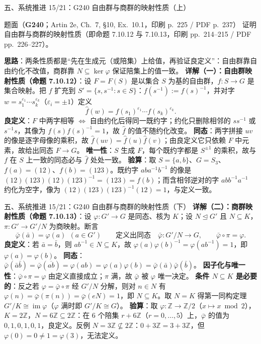 \documentclass[aspectratio=169,10pt,fontset=none]{ctexbeamer}
\newcommand{\ex}[1]{\textcolor{accent}{\footnotesize\bfseries #1}}
\newcommand{\key}[1]{\textcolor{ink}{\bfseries #1}}
\begin{document}
\begin{frame}[t]{五、系统推进 15/21：G240 自由群与商群的映射性质（上）}
\label{ex:G240}
\scriptsize
\begin{block}{\footnotesize 题面（\ex{G240}；Artin 2e, Ch.~7, \S10, Ex.~10.1，印刷 p.~225 / PDF p.~237）}
证明自由群与商群的映射性质（即命题 7.10.12 与 7.10.13，印刷 pp.~214--215 / PDF pp.~226--227）。
\end{block}
\key{思路}：两条性质都是“先在生成元（或陪集）上给值，再验证良定义”：自由群靠自由约化不改值，商群靠 $N\subseteq\ker\varphi$ 保证陪集上的值一致。
\key{详解（一）：自由群映射性质（命题 7.10.12）}：设 $F=F(S)$ 是以集合 $S$ 为基的自由群，$f:S\to G$ 是集合映射。把 $f$ 扩充到 $S'=\{s,s^{-1}:s\in S\}$：$f(s^{-1}):=f(s)^{-1}$，并对字 $w=s_1^{\varepsilon_1}\cdots s_k^{\varepsilon_k}$（$\varepsilon_i=\pm1$）定义
\[ \widehat f(w)=f(s_1)^{\varepsilon_1}\cdots f(s_k)^{\varepsilon_k}. \]
\textbf{良定义}：$F$ 中两字相等 $\iff$ 自由约化后得同一既约字；约化只删除相邻的 $ss^{-1}$ 或 $s^{-1}s$，其像为 $f(s)f(s)^{-1}=1$，故 $\widehat f$ 的值不随约化改变。
\textbf{同态}：两字拼接 $uv$ 的像是逐字母像的乘积，故 $\widehat f(uv)=\widehat f(u)\widehat f(v)$；由良定义它只依赖 $F$ 中元素，故给出同态 $F\to G$。
\textbf{唯一性}：$S$ 生成 $F$，每个既约字都是 $S^{\pm1}$ 的乘积，故与 $f$ 在 $S$ 上一致的同态必与 $\widehat f$ 处处一致。
\key{验算}：取 $S=\{a,b\}$、$G=S_3$、$f(a)=(12)$、$f(b)=(123)$。既约字 $aba^{-1}b^{-1}$ 的像是 $(12)(123)(12)(123)^{-1}=(123)=f(b)$；而含相邻逆对的字 $abb^{-1}a^{-1}$ 约化为空字，像为 $(12)(123)(123)^{-1}(12)=1$，与定义一致。
\end{frame}

\begin{frame}[t]{五、系统推进 15/21：G240 自由群与商群的映射性质（下）}
\scriptsize
\key{详解（二）：商群映射性质（命题 7.10.13）}：设 $\varphi:G'\to G$ 是同态、核为 $K$；设 $N\trianglelefteq G'$ 且 $N\subseteq K$，$\pi:G'\to G'/N$ 为商映射。断言
\[ \bar\varphi(\bar a)=\varphi(a)\ \ (a\in G')\qquad\text{定义出同态}\quad \bar\varphi:G'/N\to G,\qquad \bar\varphi\circ\pi=\varphi. \]
\textbf{良定义}：若 $\bar a=\bar b$，则 $ab^{-1}\in N\subseteq K$，故 $\varphi(a)\varphi(b)^{-1}=\varphi(ab^{-1})=1$，即 $\varphi(a)=\varphi(b)$。
\textbf{同态}：$\bar\varphi(\bar a\bar b)=\bar\varphi(\overline{ab})=\varphi(ab)=\varphi(a)\varphi(b)=\bar\varphi(\bar a)\bar\varphi(\bar b)$。
\textbf{因子化与唯一性}：$\bar\varphi\circ\pi=\varphi$ 由定义直接成立；$\pi$ 满，故 $\bar\varphi$ 被 $\varphi$ 唯一决定。
\key{条件 $N\subseteq K$ 是必要的}：反之若 $\varphi=\bar\varphi\circ\pi$ 经 $G'/N$ 分解，则对 $n\in N$ 有 $\varphi(n)=\bar\varphi(\pi(n))=\bar\varphi(eN)=1$，即 $N\subseteq K$。取 $N=K$ 得第一同构定理 $G'/K\cong\operatorname{im}\varphi$（$\varphi$ 满时即 $G'/K\cong G$）。
\key{验算}：取 $\varphi:\mathbb Z\to\mathbb Z/2$（$x\mapsto x\bmod 2$），$K=2\mathbb Z$，$N=6\mathbb Z\subseteq 2\mathbb Z$：在 $6$ 个陪集 $r+6\mathbb Z$（$r=0,\dots,5$）上，$\bar\varphi$ 的值为 $0,1,0,1,0,1$，良定义。反例 $N=3\mathbb Z\not\subseteq 2\mathbb Z$：$0+3\mathbb Z=3+3\mathbb Z$，但 $\varphi(0)=0\ne1=\varphi(3)$，无法定义。
\end{frame}
\end{document}
